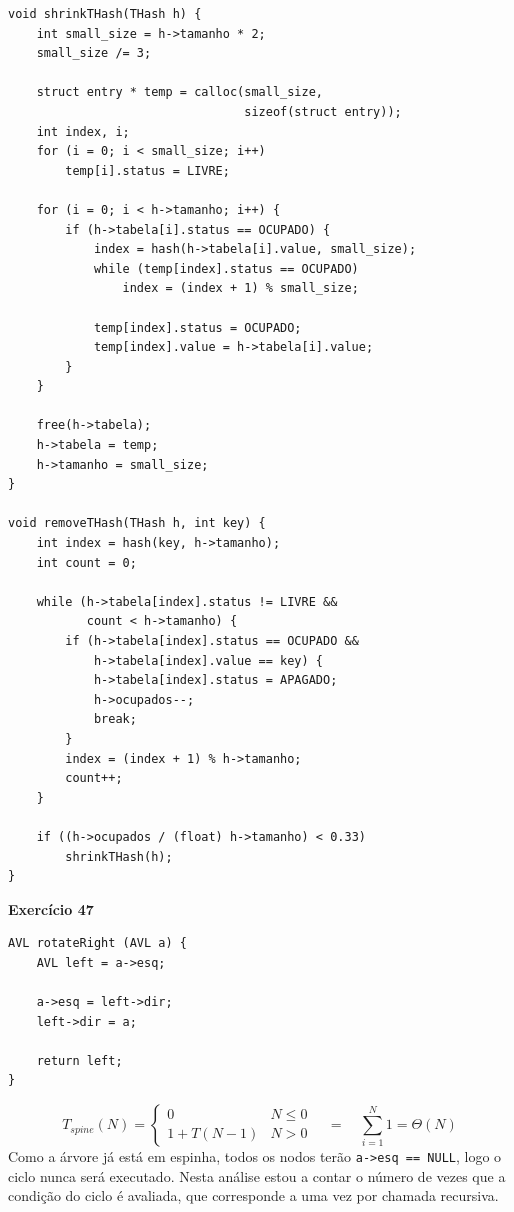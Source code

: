 \documentclass[a4paper,11pt]{article}
\begin{document}
\begin{verbatim}
void shrinkTHash(THash h) {
	int small_size = h->tamanho * 2;
	small_size /= 3;
	
	struct entry * temp = calloc(small_size, 
								 sizeof(struct entry));
	int index, i;
	for (i = 0; i < small_size; i++)
		temp[i].status = LIVRE;
	
	for (i = 0; i < h->tamanho; i++) {
		if (h->tabela[i].status == OCUPADO) {
			index = hash(h->tabela[i].value, small_size);
			while (temp[index].status == OCUPADO)
				index = (index + 1) % small_size;
			
			temp[index].status = OCUPADO;
			temp[index].value = h->tabela[i].value;
		}
	}
	
	free(h->tabela);
	h->tabela = temp;
	h->tamanho = small_size;
}

void removeTHash(THash h, int key) {
	int index = hash(key, h->tamanho);
	int count = 0;
	
	while (h->tabela[index].status != LIVRE && 
		   count < h->tamanho) {
		if (h->tabela[index].status == OCUPADO &&
			h->tabela[index].value == key) {
			h->tabela[index].status = APAGADO;
			h->ocupados--;
			break;
		}
		index = (index + 1) % h->tamanho;
		count++;
	}
	
	if ((h->ocupados / (float) h->tamanho) < 0.33)
		shrinkTHash(h);
}
\end{verbatim}

\noindent \textbf{Exercício 47}

\begin{verbatim}
AVL rotateRight (AVL a) {
	AVL left = a->esq;
	
	a->esq = left->dir;
	left->dir = a;
	
	return left;
}
\end{verbatim}
\[
	T_{spine}(N) =
	\begin{cases}
		0 & N \leq 0 \\
		1 + T(N - 1) & N > 0
	\end{cases}
	\quad = \quad \sum_{i=1}^{N} 1 = \Theta(N)
\]
Como a árvore já está em espinha, todos os nodos terão \texttt{a->esq == NULL}, logo o ciclo nunca será executado. Nesta análise estou a contar o número de vezes que a condição do ciclo é avaliada, que corresponde a uma vez por chamada recursiva.
\end{document}
